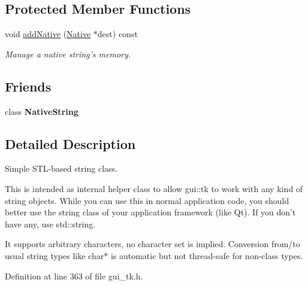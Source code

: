\subsection*{Protected Member Functions}
\begin{DoxyCompactItemize}
\item 
\hypertarget{classGUI_1_1String_aee056eca155c99dcda0c4f65899e7b1f}{void \hyperlink{classGUI_1_1String_aee056eca155c99dcda0c4f65899e7b1f}{add\-Native} (\hyperlink{classGUI_1_1String_1_1Native}{Native} $\ast$dest) const }\label{classGUI_1_1String_aee056eca155c99dcda0c4f65899e7b1f}

\begin{DoxyCompactList}\small\item\em Manage a native string's memory. \end{DoxyCompactList}\end{DoxyCompactItemize}
\subsection*{Friends}
\begin{DoxyCompactItemize}
\item 
\hypertarget{classGUI_1_1String_adf0ad3438dafc3424870951a9f75f05e}{class {\bfseries Native\-String}}\label{classGUI_1_1String_adf0ad3438dafc3424870951a9f75f05e}

\end{DoxyCompactItemize}


\subsection{Detailed Description}
Simple S\-T\-L-\/based string class. 

This is intended as internal helper class to allow gui\-::tk to work with any kind of string objects. While you can use this in normal application code, you should better use the string class of your application framework (like Qt). If you don't have any, use std\-::string.

It supports arbitrary characters, no character set is implied. Conversion from/to usual string types like {\ttfamily char$\ast$} is automatic but not thread-\/safe for non-\/class types. 

Definition at line 363 of file gui\-\_\-tk.\-h.



